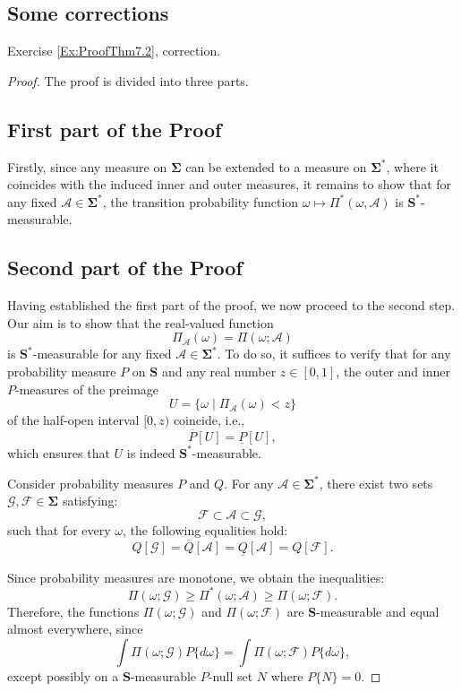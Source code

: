 \subsection{Some corrections}
Exercise \ref{Ex:ProofThm7.2}, correction.
\begin{proof}
    The proof is divided into three parts.  
 \subsection*{First part of the Proof}   
    Firstly, since any measure on $\mathbf{\Sigma}$ can be extended to a measure on $\mathbf{\Sigma^*}$, where it coincides with the induced inner and outer measures, it remains to show that for any fixed $\mathcal{A} \in \mathbf{\Sigma^*}$, the transition probability function $\omega \mapsto \Pi^*(\omega, \mathcal{A})$ is $\mathbf{S^*}$-measurable.
    
\subsection*{Second part of the Proof}
Having established the first part of the proof, we now proceed to the second step. Our aim is to show that the real-valued function  
\[
\Pi_{\mathcal{A}}(\omega) = \Pi(\omega; \mathcal{A})
\]
is $\mathbf{S^*}$-measurable for any fixed $\mathcal{A} \in \mathbf{\Sigma^*}$. To do so, it suffices to verify that for any probability measure $P$ on $\mathbf{S}$ and any real number $z \in [0,1]$, the outer and inner $P$-measures of the preimage 
\[
U = \{ \omega \mid \Pi_{\mathcal{A}}(\omega) < z\}
\]
of the half-open interval $[0, z)$ coincide, i.e., 
\[
\overline{P} [U ] = \underline{P} [U ],
\]
which ensures that $U$ is indeed $\mathbf{S^*}$-measurable.

Consider probability measures $P$ and $Q$. For any $\mathcal{A} \in \mathbf{\Sigma^*}$, there exist two sets $\mathcal{G}, \mathcal{F} \in \mathbf{\Sigma}$ satisfying:
\[
\mathcal{F} \subset \mathcal{A} \subset \mathcal{G},
\]
such that for every $\omega$, the following equalities hold:
\[
Q[\mathcal{G}] = \overline{Q} [\mathcal{A}] = \underline{Q}[\mathcal{A}] = Q[\mathcal{F}].
\]

Since probability measures are monotone, we obtain the inequalities:
\[
\Pi(\omega; \mathcal{G}) \geq \Pi^*(\omega; \mathcal{A}) \geq \Pi(\omega; \mathcal{F}).
\]
Therefore, the functions $\Pi(\omega; \mathcal{G})$ and $\Pi(\omega; \mathcal{F})$ are $\mathbf{S}$-measurable and equal almost everywhere,
since
\[
\int \Pi(\omega; \mathcal{G}) P\{d\omega\} = \int \Pi(\omega; \mathcal{F}) P\{d\omega\},
\]
except possibly on a $\mathbf{S}$-measurable $P$-null set $N$ where $P\{N\} = 0$.


\end{proof}
